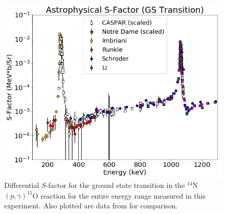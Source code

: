 \begin{figure}
		\includegraphics[width=1.0\linewidth]{figures/fullGS.png}
	\caption{Differential $S$-factor for the ground state transition in the $^{14}$N$\left( p,\gamma \right) ^{15}$O reaction for the entire energy range measured in this experiment. Also plotted are data from \cite{Schroder1987, Imbriani2005, Runkle2005, Li2016} for comparison.  }
	\label{fig: fullGS}
\end{figure}




